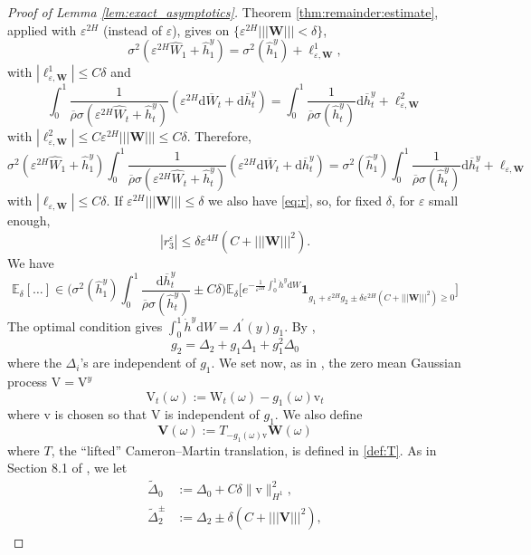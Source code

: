 \documentclass[11pt]{article}
\theoremstyle{plain}
\theoremstyle{definition}
\theoremstyle{remark}
\renewcommand{\bar}{\overline}
\renewcommand{\tilde}{\widetilde}
\renewcommand{\hat}{\widehat}
\newcommand{\dd}{\mathrm{d}}
\newcommand{\bE}{\mathbb{E}}
\newcommand{\1}{\mathbf{1}}
\numberwithin{equation}{section}
\def\eps{\varepsilon}
\def\W{\mathrm W}
\def\V{\mathrm V}
\def\v{\mathrm v}
\def\WW{\mathbf W}
\def\VV{\mathbf V}
\begin{document}
\begin{proof}[Proof of Lemma \ref{lem:exact_asymptotics}]
{}
Theorem \ref{thm:remainder:estimate}, applied with $\eps^{2H}$ (instead of $\eps$), gives
on $\{\eps^{2H} |||\WW|||<\delta\}$,
\[
\sigma^2 (\eps^{2H} \hat{W}_1+\hat{h}_1^y)
=
\sigma^2 (\hat{h}_1^y)
+
\ell^1_{\eps,\WW},
\]
with $|\ell^1_{\eps, \WW}| \leq C \delta$ and
\[
\int_0^1\frac{1}{\bar{\rho} \sigma(\eps^{2H}  \hat{W}_t+\hat{h}_t^y) } ( { \eps^{2H}}    \dd \bar{W}_t + \dd \bar{h}_t^y ) = 
\int_0^1\frac{1}{\bar{\rho} \sigma(\hat{h}_t^y) } \dd \bar{h}_t^y +\ell^2_{\eps,\WW}
\]
with $|\ell^2_{\eps,\WW}| \leq C \eps^{2H}|||\WW||| \leq C \delta$. Therefore,
\[
\sigma^2 (\eps^{2H} \hat{W}_1+\hat{h}_1^y)
\int_0^1\frac{1}{\bar{\rho} \sigma(\eps^{2H}  \hat{W}_t+\hat{h}_t^y) } ( { \eps^{2H}}    \dd \bar{W}_t + \dd \bar{h}_t^y ) = 
\sigma^2 (\hat h_1^y)\int_0^1\frac{1}{\bar{\rho} \sigma(\hat{h}_t^y) } \dd \bar{h}_t^y +\ell_{\eps,\WW}
\]
with $|\ell_{\eps,\WW}|\leq C\delta$.
If $\eps^{2H}|||\WW|||\leq \delta$ we also have \eqref{eq:r}, so, for fixed $\delta$, for $\eps$ small enough, 
\[
|r_3^{\eps}| \leq \delta \eps^{4H} (C+|||\WW|||^2).
\]
 We have
\begin{equation}\label{eq:reduced}
\bE_\delta[\dots]
\in
\bigg(
\sigma^2 (\hat{h}_1^y)
\int_0^1\frac{\dd \bar{h}_t^y}{\bar{\rho} \sigma(\hat{h}_t^y) }  \pm C\delta\bigg)
\bE_\delta \bigg[ e^{-\frac{1}{\eps^{2H}} \int_0^1 \dot{h}^y \dd W }
\1_{ g_1  + \eps^{2H} g_2   \pm \delta \eps^{2H} (C+|||\WW|||^2) \geq 0} 
\bigg]
\end{equation}
The optimal condition \cite[Lemma C.3]{friz2018precise1} gives $\int_0^1 \dot{h}^y \dd W = \Lambda^{\prime}(y)g_1$.
By \cite[Lemma 8.3]{friz2018precise1},
\begin{equation}\label{dec:g2}
g_2 = \Delta_2 + g_1 \Delta_1 + g_1^2 \Delta_0
\end{equation}
where the $\Delta_i$'s are independent of $g_1$. We set now, as in \cite{azencott1985petites}, the zero mean Gaussian process $\V =\V^y$ 
\begin{equation} \label{defV}
       \V_t (\omega)  := \W_t (\omega) - g_1(\omega) \v_t
\end{equation}
where $\v$ is chosen so that $\V$ is independent of $g_1$. We also define
\[
\VV (\omega) := T_{- g_1(\omega) \v} \WW (\omega)
\]
where $T$, the ``lifted'' Cameron--Martin translation, is defined in \eqref{def:T}. As in Section 8.1 of \cite{friz2018precise1}, we let
\[\begin{split}
\tilde \Delta_{0}  &:= \Delta _{0} + C \delta \| \v \|^2_{H^1}, \\
\tilde \Delta^\pm_{2} &:= \Delta _{2} \pm \delta (C+ ||| \VV |||^2), 

\end{split}\]
\end{proof}
\end{document}
